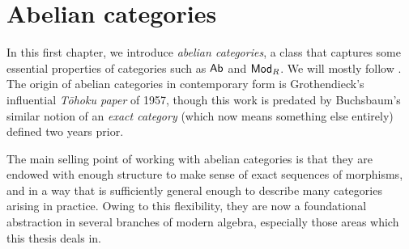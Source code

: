 \chapter{Abelian categories}
\label{chap_abelian_categories}

In this first chapter, we introduce \emph{abelian categories}, a
class that captures some essential properties of categories such as
$\mathsf{Ab}$ and ${\mathsf{Mod}}_{{R}}$.
We will mostly follow
\cite{category_theory_for_the_working_mathematician, freyd_abelian_categories}.
The origin of abelian categories in contemporary form is
Grothendieck's influential \emph{T\={o}hoku paper} of 1957, though
this work is predated by Buchsbaum's similar notion of an \emph{exact
category} (which now means something else entirely) defined two years prior.

The main selling point of working with abelian categories is that
they are endowed with enough structure to make sense of exact
sequences of morphisms, and in a way that is sufficiently general
enough to describe many categories arising in practice.
Owing to this flexibility, they are now a foundational abstraction in
several branches of modern algebra, especially those areas which this
thesis deals in.



